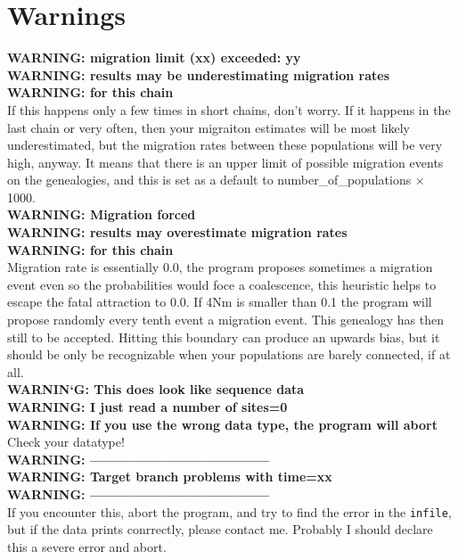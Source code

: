 \section{Warnings}
{\bf WARNING: migration limit (xx) exceeded: yy}\\
{\bf WARNING: results may be underestimating migration rates}\\
{\bf WARNING: for this chain}\\
If this happens only a few times in short chains, don't worry. If it happens
in the last chain or very often, then your migraiton estimates will be most
likely underestimated, but the migration rates between these populations will
be very high, anyway. It means that there is an upper limit of possible migration events on the genealogies, and this is set as a default to 
number\_of\_populations $\times$ 1000.\\
\smallerskip
{\bf WARNING: Migration forced}\\
{\bf WARNING: results may overestimate migration rates}\\
{\bf WARNING: for this chain}\\
Migration rate is essentially 0.0, the program proposes sometimes a migration
event even so the probabilities would foce a coalescence, this heuristic
helps to escape the fatal attraction to 0.0.
If 4Nm is smaller than 0.1 the program will propose randomly every tenth
event a migration event. This genealogy has then still to be accepted.
Hitting this boundary can produce an upwards bias, but it should be
only be recognizable when your populations are barely connected, if at all.\\
\smallerskip
{\bf WARNIN`G: This does look like sequence data}\\
{\bf WARNING: I just read a number of sites=0}\\
{\bf WARNING: If you use the wrong data type, the program will abort}\\
Check your datatype!\\
\smallerskip
{\bf WARNING: --------------------------------------}\\
{\bf WARNING: Target branch problems with time=xx}\\
{\bf WARNING: --------------------------------------}\\
If you encounter this, abort the program, and try to find the error
in the {\tt infile}, but if the data prints conrrectly, 
please contact me. Probably I should declare this 
a severe error and abort.\\
\smallerskip
